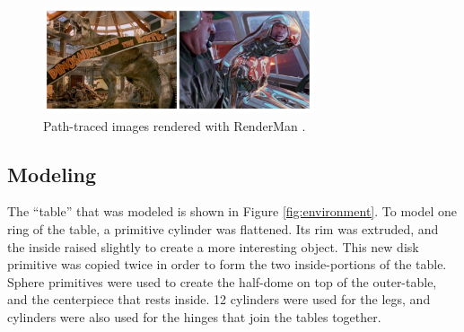 \documentclass[conference]{IEEEtran}
\begin{document}
\begin{figure}[htbp]
\centerline{\includegraphics[width=8cm]{renderman.png}}
\caption{Path-traced images rendered with RenderMan \cite{renderman}.}
\label{fig:renderman}
\end{figure}

\subsection{Modeling}
The ``table'' that was modeled is shown in Figure \ref{fig:environment}.
To model one ring of the table, a primitive cylinder was flattened.
Its rim was extruded, and the inside raised slightly to create a more interesting object.
This new disk primitive was copied twice in order to form the two inside-portions of the table.
Sphere primitives were used to create the half-dome on top of the outer-table, and the centerpiece
that rests inside. 12 cylinders were used for the legs, and cylinders were also used
for the hinges that join the tables together.
\end{document}
